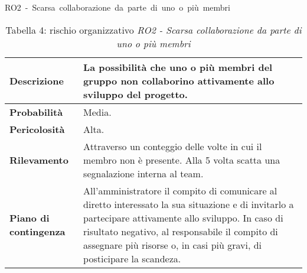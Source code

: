 \documentclass[italian,12pt]{article} %
\begin{document}
\begin{table}[!h]
    \centering
    \hbox{RO2 - Scarsa collaborazione da parte di uno o più membri}
    \vspace{0.3cm}
	\begin{tabular}{|l|p{10cm}|} 
		\hline
		\textbf{Descrizione} & La possibilità che uno o più membri del gruppo non collaborino attivamente allo sviluppo del progetto. \\ 
        \hline
        \textbf{Probabilità} & Media. \\
        \hline
        \textbf{Pericolosità} & Alta. \\
        \hline
        \textbf{Rilevamento} & Attraverso un conteggio delle volte in cui il membro non è presente. Alla 5 volta scatta una segnalazione interna al team. \\
        \hline
        \textbf{Piano di contingenza} & All'amministratore il compito di comunicare al diretto interessato la sua situazione e di invitarlo a partecipare attivamente allo sviluppo. In caso di risultato negativo, al responsabile il compito di assegnare più risorse o, in casi più gravi, di posticipare la scandeza. \\
		\hline
	\end{tabular}
    \caption{Tabella 4: rischio organizzativo \textit{RO2 - Scarsa collaborazione da parte di uno o più membri}}
\end{table}
\end{document}
